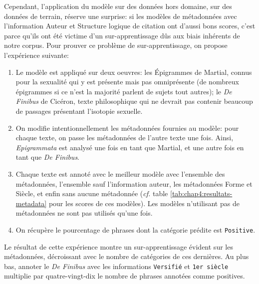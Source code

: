 Cependant, l'application du modèle sur des données hors domaine, sur des données de terrain, réserve une surprise: si les modèles de métadonnées avec l'information Auteur et Structure logique de citation ont d'aussi bons scores, c'est parce qu'ils ont été victime d'un sur-apprentissage dûs aux biais inhérents de notre corpus. Pour prouver ce problème de sur-apprentissage, on propose l'expérience suivante:
\begin{enumerate}
    \item Le modèle est appliqué sur deux oeuvres: les Épigrammes de Martial, connus pour la sexualité qui y est présente mais pas omniprésente (de nombreux épigrammes si ce n'est la majorité parlent de sujets tout autres); le \textit{De Finibus} de Cicéron, texte philosophique qui ne devrait pas contenir beaucoup de passages présentant l'isotopie sexuelle.
    \item On modifie intentionnellement les métadonnées fournies au modèle: pour chaque texte, on passe les métadonnées de l'autre texte une fois. Ainsi, \textit{Epigrammata} est analysé une fois en tant que Martial, et une autre fois en tant que \textit{De Finibus}.
    \item Chaque texte est annoté avec le meilleur modèle avec l'ensemble des métadonnées, l'ensemble sauf l'information auteur, les métadonnées Forme et Siècle, et enfin sans aucune métadonnée (\textit{cf.} table \ref{tab:chap4:resultats-metadata} pour les scores de ces modèles). Les modèles n'utilisant pas de métadonnées ne sont pas utilisés qu'une fois.
    \item On récupère le pourcentage de phrases dont la catégorie prédite est \texttt{Positive}.
\end{enumerate}
Le résultat de cette expérience montre un sur-apprentissage évident sur les métadonnées, décroissant avec le nombre de catégories de ces dernières. Au plus bas, annoter le \textit{De Finibus} avec les informations \texttt{Versifié} et \texttt{1er siècle} multiplie par quatre-vingt-dix le nombre de phrases annotées comme positives.

